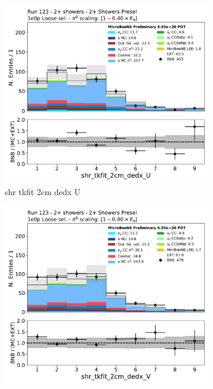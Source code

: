 \begin{figure}[H]
    \centering
    \begin{subfigure}{0.3\textwidth}
    \includegraphics[width=1.0\textwidth]{Sidebands/Figures/TwoShr_1e0pSel/loose/shr_tkfit_2cm_dedx_U.pdf}
    \caption{shr tkfit 2cm dedx U}
    \end{subfigure}
    \begin{subfigure}{0.3\textwidth}
    \includegraphics[width=1.0\textwidth]{Sidebands/Figures/TwoShr_1e0pSel/loose/shr_tkfit_2cm_dedx_V.pdf}

\end{subfigure}
\end{figure}
